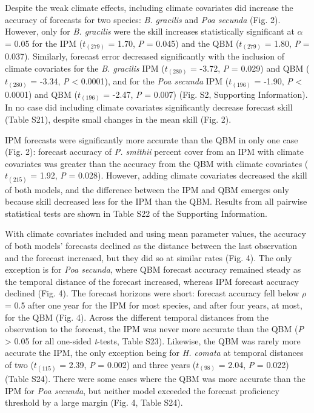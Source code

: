 \documentclass[12pt,]{article}
\begin{document}
Despite the weak climate effects, including climate covariates did
increase the accuracy of forecasts for two species: \emph{B. gracilis}
and \emph{Poa secunda} (Fig. 2). However, only for \emph{B. gracilis}
were the skill increases statistically significant at \(\alpha\) = 0.05
for the IPM (\(t_{(279)}\) = 1.70, \emph{P} = 0.045) and the QBM
(\(t_{(279)}\) = 1.80, \emph{P} = 0.037). Similarly, forecast error
decreased significantly with the inclusion of climate covariates for the
\emph{B. gracilis} IPM (\(t_{(280)}\) = -3.72, \emph{P} = 0.029) and QBM
(\(t_{(280)}\) = -3.34, \emph{P} \textless{} 0.0001), and for the
\emph{Poa secunda} IPM (\(t_{(196)}\) = -1.90, \emph{P} \textless{}
0.0001) and QBM (\(t_{(196)}\) = -2.47, \emph{P} = 0.007) (Fig. S2,
Supporting Information). In no case did including climate covariates
significantly decrease forecast skill (Table S21), despite small changes
in the mean skill (Fig. 2).

IPM forecasts were significantly more accurate than the QBM in only one
case (Fig. 2): forecast accuracy of \emph{P. smithii} percent cover from
an IPM with climate covariates was greater than the accuracy from the
QBM with climate covariates (\(t_{(215)}\) = 1.92, \emph{P} = 0.028).
However, adding climate covariates decreased the skill of both models,
and the difference between the IPM and QBM emerges only because skill
decreased less for the IPM than the QBM. Results from all pairwise
statistical tests are shown in Table S22 of the Supporting Information.

With climate covariates included and using mean parameter values, the
accuracy of both models' forecasts declined as the distance between the
last observation and the forecast increased, but they did so at similar
rates (Fig. 4). The only exception is for \emph{Poa secunda}, where QBM
forecast accuracy remained steady as the temporal distance of the
forecast increased, whereas IPM forecast accuracy declined (Fig. 4). The
forecast horizons were short: forecast accuracy fell below \(\rho\) =
0.5 after one year for the IPM for most species, and after four years,
at most, for the QBM (Fig. 4). Across the different temporal distances
from the observation to the forecast, the IPM was never more accurate
than the QBM (\emph{P} \textgreater{} 0.05 for all one-sided
\emph{t}-tests, Table S23). Likewise, the QBM was rarely more accurate
the IPM, the only exception being for \emph{H. comata} at temporal
distances of two (\(t_{(115)}\) = 2.39, \emph{P} = 0.002) and three
years (\(t_{(98)}\) = 2.04, \emph{P} = 0.022) (Table S24). There were
some cases where the QBM was more accurate than the IPM for
\emph{Poa secunda}, but neither model exceeded the forecast proficiency
threshold by a large margin (Fig. 4, Table S24).
\end{document}
